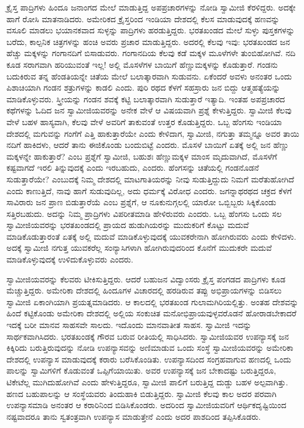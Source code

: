  ಕ್ರೈಸ್ತ ಪಾದ್ರಿಗಳು ಹಿಂದೂ ಜನಾಂಗದ ಮೇಲೆ ಮಾಡುತ್ತಿದ್ದ ಅಪಪ್ರಚಾರಗಳನ್ನು ನೋಡಿ ಸ್ವಾಮೀಜಿ ಕೆರಳಿದ್ದರು. ಅದಕ್ಕೇ ಹಾಗೆ ರೋಸಿ ಮಾತನಾಡಿದರು. ಅಮೇರಿಕದ ಕ್ರೈಸ್ತರಿಂದ ಇಂಡಿಯಾ ದೇಶದಲ್ಲಿ ಕೆಲಸ ಮಾಡುವುದಕ್ಕೆ ಹಣವನ್ನು ವಸೂಲಿ ಮಾಡಲು ಭಯಾನಕವಾದ ಸುಳ್ಳನ್ನು ಪಾದ್ರಿಗಳು ಹರಡುತ್ತಿದ್ದರು. ಭರತಖಂಡದ ಮೇಲೆ ಸುಳ್ಳು ಪುಸ್ತಕಗಳನ್ನು ಬರೆದು, ಕಾಲ್ಪನಿಕ ಚಿತ್ರಗಳನ್ನು ಹಂಚಿ ಅವರು ಪ್ರಚಾರ ಮಾಡುತ್ತಿದ್ದರು. ಅದರಲ್ಲಿ ಕೆಲವು ಇವು: ಭರತಖಂಡದ ಜನ ಹೆಚ್ಚು ಮಕ್ಕಳನ್ನು ಗಂಗಾನದಿಗೆ ಬಿಸಾಡುವರು. ಗಂಗಾನದಿಯ ಕೆಲವು ಕಡೆ ಮಕ್ಕಳ ಮೂಳೆಗಳೇ ತುಂಬಿಹೋಗಿವೆ. ನದಿ ಕೂಡ ಸರಾಗವಾಗಿ ಹರಿಯುವಂತೆ ಇಲ್ಲ! ಅಲ್ಲಿ ಮೊಸಳೆಗಳ ಬಾಯಿಗೆ ಹೆಣ್ಣುಮಕ್ಕಳನ್ನು ಕೊಡುತ್ತಾರೆ. ಗಂಡನು ಬದುಕಿರುವ ತನ್ನ ಹೆಂಡತಿಯನ್ನೇ ಚಿತೆಯ ಮೇಲೆ ಬಲಾತ್ಕಾರವಾಗಿ ಸುಡುವನು. ಏಕೆಂದರೆ ಅವಳು ಅನಂತರ ಒಂದು ಪಿಶಾಚಿಯಾಗಿ ಗಂಡನ ಶತ್ರುಗಳನ್ನು ಕಾಡಲಿ ಎಂದು. ಪುರಿ ರಥದ ಕೆಳಗೆ ಸಹಸ್ರಾರು ಜನ ಬಿದ್ದು ಆತ್ಮಹತ್ಯೆಯನ್ನು ಮಾಡಿಕೊಳ್ಳುವರು. ಸ್ತ್ರೀಯನ್ನು ಗಂಡನ ಶವಕ್ಕೆ ಕಟ್ಟಿ ಬಲಾತ್ಕಾರವಾಗಿ ಸುಡುತ್ತಾರೆ ಇತ್ಯಾದಿ. ಇಂತಹ ಅಪಪ್ರಚಾರದ ಕಥೆಗಳನ್ನು ಓದಿದ ಜನ ಸ್ವಾಮೀಜಿಯವರನ್ನು ಅನೇಕ ವೇಳೆ ಆ ವಿಷಯವಾಗಿ ಪ್ರಶ್ನೆ ಕೇಳುತ್ತಿದ್ದರು. ಸ್ವಾಮೀಜಿ ಕೆಲವು ವೇಳೆ ಬಹಳ ಹಾಸ್ಯವಾಗಿ, ಕೆಲವು ವೇಳೆ ಅವರಿಗೆ ತಾಕುವಂತೆ ಉತ್ತರ ಕೊಡುತ್ತಿದ್ದರು. ಒಬ್ಬ ಹೆಂಗಸು ಇಂಡಿಯಾ ದೇಶದಲ್ಲಿ ಮಗುವನ್ನು ಗಂಗೆಗೆ ಎತ್ತಿ ಹಾಕುತ್ತಾರೆಯೇ ಎಂದು ಕೇಳಿದಾಗ, ಸ್ವಾಮೀಜಿ, ನಗುತ್ತಾ ತಮ್ಮನ್ನೂ ಅವರ ತಾಯಿ ನದಿಗೆ ಹಾಕಿದಳು, ಆದರೆ ತಾನು ಈಜಿಕೊಂಡು ಬಂದುಬಿಟ್ಟೆ ಎಂದರು. ಮೊಸಳೆ ಬಾಯಿಗೆ ಏತಕ್ಕೆ ಅಲ್ಲಿ ಜನ ಹೆಣ್ಣು ಮಕ್ಕಳನ್ನೇ ಹಾಕುತ್ತಾರೆ? ಎಂಬ ಪ್ರಶ್ನೆಗೆ ಸ್ವಾಮೀಜಿ, ಬಹುಶಃ ಹೆಣ್ಣುಮಕ್ಕಳ ಮಾಂಸ ಮೃದುವಾಗಿದೆ, ಮೊಸಳೆಗೆ ಕಷ್ಟವಾಗದೆ ಇರಲಿ ತಿನ್ನುವುದಕ್ಕೆ ಎಂದು ಇರಬಹುದು, ಎಂದರು. ಹೆಂಗಸನ್ನು ಚಿತೆಯಲ್ಲಿ ಗಂಡನೊಡನೆ ಸುಡುತ್ತಾರೆಯೇ? ಎಂಬುದಕ್ಕೆ ನಿಮ್ಮ ದೇಶದಲ್ಲಿ ಮಾಟಗಾತಿಯರನ್ನು ನೀವು ಸುಡುತ್ತಿದ್ದುದು ನಿಮಗೆ ಮರೆತುಹೋಗಿದೆ ಎಂದು ಕಾಣುತ್ತಿದೆ, ನಾವು ಹಾಗೆ ಸುಡುವುದಿಲ್ಲ, ಅದು ಧರ್ಮಕ್ಕೆ ವಿರೋಧ ಎಂದರು. ಜಗನ್ನಾಥರಥದ ಚಕ್ರದ ಕೆಳಗೆ ಸಾವಿರಾರು ಜನ ಪ್ರಾಣ ಬಿಡುತ್ತಾರೆಯೆ ಎಂಬ ಪ್ರಶ್ನೆಗೆ, ಆ ನೂಕುನುಗ್ಗಲಲ್ಲಿ ಯಾರೋ ಒಬ್ಬಿಬ್ಬರು ಸಿಕ್ಕಿಕೊಂಡು ಸತ್ತಿರಬಹುದು. ಅದನ್ನು ನಿಮ್ಮ ಪ್ರಾದ್ರಿಗಳು ವಿಪರೀತಮಾಡಿ ಹೇಳಿರುವರು ಎಂದರು. ಒಬ್ಬ ಹೆಂಗಸು ಒಂದು ಸಲ ಸ್ವಾಮೀಜಿಯವರನ್ನು ಭರತಖಂಡದಲ್ಲಿ ಪ್ರಾಯದ ಹುಡುಗಿಯರನ್ನು ಮುದುಕರಿಗೆ ಕೊಟ್ಟು ಮದುವೆ ಮಾಡಿಕೊಡುತ್ತಾರಂತೆ ಏತಕ್ಕೆ ಅಲ್ಲಿ ಮದುವೆ ಮಾಡಿಕೊಳ್ಳುವುದಕ್ಕೆ ಯುವಕರೇನಾಗಿ ಹೋಗಿರುವರು ಎಂದು ಕೇಳಿದಳು. ಅದಕ್ಕೆ ಸ್ವಾಮೀಜಿ ನಗುತ್ತ ಯುವಕರೆಲ್ಲ ಸಂನ್ಯಾಸಿಗಳಾಗಿ ಹೋಗಿರುವುದರಿಂದ ಕೊನೆಗೆ ಮುದುಕರೇ ಮದುವೆ ಮಾಡಿಕೊಳ್ಳುವುದಕ್ಕೆ ಉಳಿದುಕೊಳ್ಳುವರು ಎಂದರು. 

 ಸ್ವಾಮೀಜಿಯವರನ್ನು ಕೆಲವರು ಟೀಕಿಸುತ್ತಿದ್ದರು. ಆದರೆ ಬಹುಜನ ವಿದ್ವಾಂಸರು ಕ್ರೈಸ್ತ ಪಂಗಡದ ಪಾದ್ರಿಗಳು ಕೂಡ ಮೆಚ್ಚುತ್ತಿದ್ದರು. ಅಮೇರಿಕಾ ದೇಶದಲ್ಲಿ ಹಿಂದೂಗಳ ವಿಚಾರದಲ್ಲಿ ಹರಡಿರುವ ತಪ್ಪು ಅಭಿಪ್ರಾಯಗಳನ್ನು ಬಿಡಿಸಲು ಸ್ವಾಮೀಜಿ ಏಕಾಂಗಿಯಾಗಿ ಪ್ರಯತ್ನಮಾಡಿದರು. ಆ ಕಾಲದಲ್ಲಿ ಭರತಖಂಡ ಗುಲಾಮಗಿರಿಯಲ್ಲಿತ್ತು. ಅಂತಹ ದೇಶವನ್ನು ಹಿಂದೆ ಕಟ್ಟಿಕೊಂಡು ಅಮೇರಿಕಾ ದೇಶದಲ್ಲಿ ಅಲ್ಲಿಯ ಸಂಕುಚಿತ ಮನೋಭಿಪ್ರಾಯವುಳ್ಳವರೊಡನೆ ಹೋರಾಡಬೇಕಾದರೆ ಇದಕ್ಕೆ ಬರೀ ಮಾನವ ಸಾಹಸವೇ ಸಾಲದು. ಇದೊಂದು ಮಾನವಾತೀತ ಸಾಹಸ. ಸ್ವಾಮೀಜಿ ಇದನ್ನು ಸಾರ್ಥಕವಾಗಿಸಿದರು. ಭರತಖಂಡಕ್ಕೆ ಗೌರವ ಬರುವ ರೀತಿಯಲ್ಲಿ ಸಾಧಿಸಿದರು. ಸ್ವಾಮೀಜಿಯವರ ಉಪನ್ಯಾಸಕ್ಕೆ ಜನ ಕಿಕ್ಕಿರಿದು ಬರುತ್ತಿರುವುದನ್ನು ನೋಡಿ ಉಪನ್ಯಾಸವನ್ನು ಅಣಿಮಾಡುವ ಒಂದು ಸಂಸ್ಥೆ ಸ್ವಾಮೀಜಿಯವರನ್ನು ಅಮೇರಿಕಾ ದೇಶದಲ್ಲಿ ಉಪನ್ಯಾಸ ಮಾಡುವುದಕ್ಕೆ ಕರಾರು ಬರೆಸಿಕೊಂಡಿತು. ಉಪನ್ಯಾಸದಿಂದ ಸಂಗ್ರಹವಾಗುವ ಹಣದಲ್ಲಿ ಒಂದು ಪಾಲನ್ನು ಸ್ವಾಮಿಗಳಿಗೆ ಕೊಡುವಂತೆ ಒಪ್ಪಿಗೆಯಾಯಿತು. ಅವರ ಉಪನ್ಯಾಸಕ್ಕೆ ಜನ ಬೇಕಾದಷ್ಟು ಬರುತ್ತಿದ್ದರೂ, ಟಿಕೇಟೆಲ್ಲ ಮುಗಿದುಹೋಗಿವೆ ಎಂದು ಹೇಳುತ್ತಿದ್ದರೂ, ಸ್ವಾಮೀಜಿ ಪಾಲಿಗೆ ಬರುತ್ತಿದ್ದ ದುಡ್ಡು ಬಹಳ ಅಲ್ಪವಾಗಿತ್ತು. ಹಣದ ಬಹುಪಾಲನ್ನು ಆ ಸಂಸ್ಥೆಯವರು ತಿಂದುಹಾಕಿ ಬಿಡುತ್ತಿದ್ದರು. ಸ್ವಾಮೀಜಿ ಕೆಲವು ಕಾಲ ಅದರ ಪರವಾಗಿ ಉಪನ್ಯಾಸಮಾಡಿ ಅನಂತರ ಆ ಕರಾರಿನಿಂದ ಬಿಡಿಸಿಕೊಂಡರು. ಅದರಿಂದ ಸ್ವಾಮೀಜಿಯವರಿಗೆ ಆರ್ಥಿಕದೃಷ್ಟಿಯಿಂದ ನಷ್ಟವಾದರೂ ತಾನು ಸ್ವತಂತ್ರವಾಗಿ ಉಪನ್ಯಾಸ ಮಾಡುತ್ತೇನೆ ಎಂದು ಅದರ ಪಾಶದಿಂದ ತಪ್ಪಿಸಿಕೊಡರು. 

